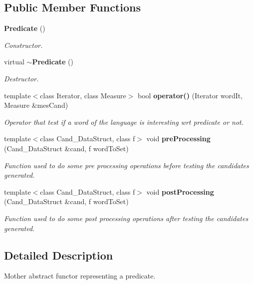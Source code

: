 \subsection*{Public Member Functions}
\begin{CompactItemize}
\item 
{\bf Predicate} ()\label{class_predicate_50088fcbd7632e6be3b2df62441535af}

\begin{CompactList}\small\item\em Constructor. \item\end{CompactList}\item 
virtual {\bf $\sim$Predicate} ()\label{class_predicate_91060d92c2f251fd3b0072a3c08f3911}

\begin{CompactList}\small\item\em Destructor. \item\end{CompactList}\item 
template$<$class Iterator, class Measure$>$ bool {\bf operator()} (Iterator word\-It, Measure \&mes\-Cand)
\begin{CompactList}\small\item\em Operator that test if a word of the language is interesting wrt predicate or not. \item\end{CompactList}\item 
template$<$class Cand\_\-Data\-Struct, class f$>$ void {\bf pre\-Processing} (Cand\_\-Data\-Struct \&cand, f word\-To\-Set)
\begin{CompactList}\small\item\em Function used to do some pre processing operations before testing the candidates generated. \item\end{CompactList}\item 
template$<$class Cand\_\-Data\-Struct, class f$>$ void {\bf post\-Processing} (Cand\_\-Data\-Struct \&cand, f word\-To\-Set)
\begin{CompactList}\small\item\em Function used to do some post processing operations after testing the candidates generated. \item\end{CompactList}\end{CompactItemize}


\subsection{Detailed Description}
Mother abstract functor representing a predicate. 

